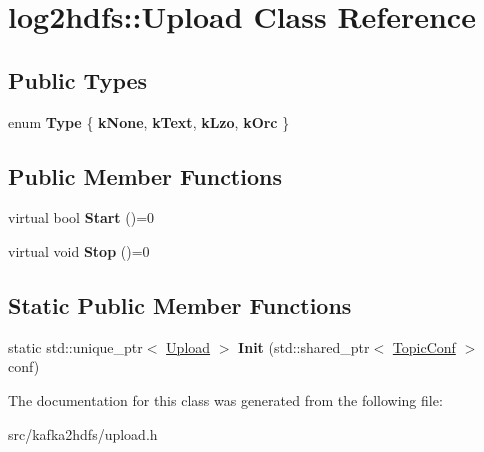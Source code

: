 \hypertarget{classlog2hdfs_1_1Upload}{}\section{log2hdfs\+:\+:Upload Class Reference}
\label{classlog2hdfs_1_1Upload}
\subsection*{Public Types}
\begin{DoxyCompactItemize}
\item 
enum {\bfseries Type} \{ {\bfseries k\+None}, 
{\bfseries k\+Text}, 
{\bfseries k\+Lzo}, 
{\bfseries k\+Orc}
 \}\hypertarget{classlog2hdfs_1_1Upload_a383ff28c4a6efc47bf8588c49ee5f2ea}{}\label{classlog2hdfs_1_1Upload_a383ff28c4a6efc47bf8588c49ee5f2ea}

\end{DoxyCompactItemize}
\subsection*{Public Member Functions}
\begin{DoxyCompactItemize}
\item 
virtual bool {\bfseries Start} ()=0\hypertarget{classlog2hdfs_1_1Upload_a35ee440a177c814b2bb408447eab4d17}{}\label{classlog2hdfs_1_1Upload_a35ee440a177c814b2bb408447eab4d17}

\item 
virtual void {\bfseries Stop} ()=0\hypertarget{classlog2hdfs_1_1Upload_acc0649799b68b9883d6bdf792ccba1b2}{}\label{classlog2hdfs_1_1Upload_acc0649799b68b9883d6bdf792ccba1b2}

\end{DoxyCompactItemize}
\subsection*{Static Public Member Functions}
\begin{DoxyCompactItemize}
\item 
static std\+::unique\+\_\+ptr$<$ \hyperlink{classlog2hdfs_1_1Upload}{Upload} $>$ {\bfseries Init} (std\+::shared\+\_\+ptr$<$ \hyperlink{classlog2hdfs_1_1TopicConf}{Topic\+Conf} $>$ conf)\hypertarget{classlog2hdfs_1_1Upload_aad588f9de89484540b6a5b18bbd6be1c}{}\label{classlog2hdfs_1_1Upload_aad588f9de89484540b6a5b18bbd6be1c}

\end{DoxyCompactItemize}


The documentation for this class was generated from the following file\+:\begin{DoxyCompactItemize}
\item 
src/kafka2hdfs/upload.\+h\end{DoxyCompactItemize}
